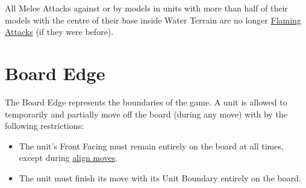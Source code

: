 All Melee Attacks against or by models in units with more than half of their models with the centre of their base inside Water Terrain are no longer \hyperref[flaming_attacks]{Flaming Attacks} (if they were before).

\section{Board Edge}
\label{board_edge}

The Board Edge represents the boundaries of the game. A unit is allowed to temporarily and partially move off the board (during any move) with by the following restrictions:

\begin{itemize}
	\item The unit's Front Facing must remain entirely on the board at all times, except during \hyperref[aligning_units]{align moves}.
	\item The unit must finish its move with its Unit Boundary entirely on the board.
\end{itemize}

\RBemc
